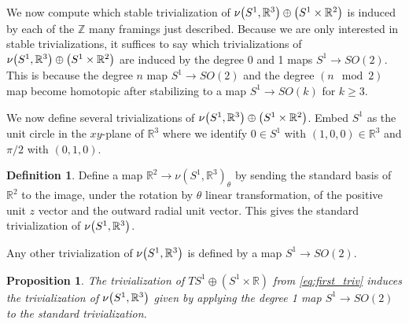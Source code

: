 \documentclass[11pt]{amsart}
\newcommand{\R}{\mathbb R}
\newcommand{\Z}{\mathbb{Z}}
\theoremstyle{plain}   %
\newtheorem{prop}[thm]{Proposition}
\theoremstyle{definition}
\newtheorem{df}[thm]{Definition}
\theoremstyle{remark}
\numberwithin{equation}{section}
\let\originalleft\left
\let\originalright\right
\renewcommand{\left}{\mathopen{}\mathclose\bgroup\originalleft}
\renewcommand{\right}{\aftergroup\egroup\originalright}
\begin{document}
We now compute which stable trivialization of $\nu\left(S^1,\R^3\right)\oplus \left(S^1\times \R^2\right)$ is induced by each of the $\Z$ many framings just described. Because we are only interested in stable trivializations, it suffices to say which trivializations of $\nu\left(S^1,\R^3\right)\oplus \left( S^1\times\R^2 \right)$ are induced by the degree 0 and 1 maps $S^1\to SO(2)$. This is because the degree $n$ map $S^1\to SO(2)$ and the degree $(n\mod 2)$ map become homotopic after stabilizing to a map $S^1\to SO(k)$ for $k\geq 3$.

We now define several trivializations of $\nu\left(S^1,\R^3\right)\oplus \left( S^1\times\R^2 \right)$. Embed $S^1$ as the unit circle in the $xy$-plane of $\R^3$ where we identify $0\in S^1$ with $(1,0,0)\in\R^{3}$ and $\pi/2$ with $(0,1,0)$. 

\begin{df}\label{df:std}
Define a map $\R^2\to \nu(S^1,\R^3)_\theta$ by sending the standard basis of $\R^2$ to the image, under the rotation by $\theta$ linear transformation, of the positive unit $z$ vector and the outward radial unit vector. This gives the standard trivialization of $\nu\left( S^1, \R^3\right)$.
\end{df}

Any other trivialization of $\nu\left( S^1,\R^3\right)$ is defined by a map $S^1\to SO(2)$. 

\begin{prop}
The trivialization of $TS^1\oplus (S^1\times\R)$ from \cref{eq:first_triv} induces the trivialization of $\nu\left( S^1,\R^3\right)$ given by applying the degree 1 map $S^1\to SO(2)$ to the standard trivialization. 
\end{prop}
\end{document}
